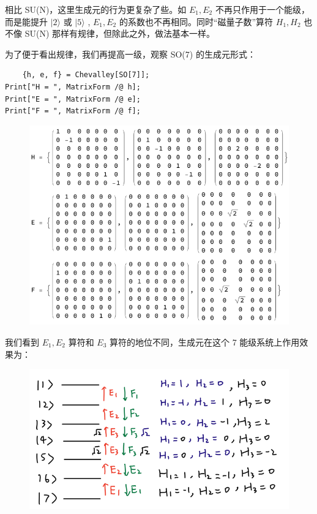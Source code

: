 \documentclass[UTF8]{ctexart}
\begin{document}
\noindent 相比 SU(N)，这里生成元的行为更复杂了些。如 $E_1,E_2$ 不再只作用于一个能级，而是能提升 $|2\rangle$ 或 $|5\rangle$ , $E_1,E_2$ 的系数也不再相同。同时“磁量子数”算符 $H_1,H_2$ 也不像 SU(N) 那样有规律，但除此之外，做法基本一样。

为了便于看出规律，我们再提高一级，观察 SO(7) 的生成元形式：
\begin{verbatim}
	{h, e, f} = Chevalley[SO[7]];
Print["H = ", MatrixForm /@ h];
Print["E = ", MatrixForm /@ e];
Print["F = ", MatrixForm /@ f];
\end{verbatim}

\begin{figure}[H]
\begin{centering}
\includegraphics[width=0.8\linewidth]{include/O13}
\par\end{centering}
\end{figure}

\noindent 我们看到 $E_1,E_2$ 算符和 $E_3$ 算符的地位不同，生成元在这个 7 能级系统上作用效果为：

\begin{figure}[H]
\begin{centering}
\includegraphics[width=0.7\linewidth]{include/P4}
\par\end{centering}
\end{figure}
\end{document}
